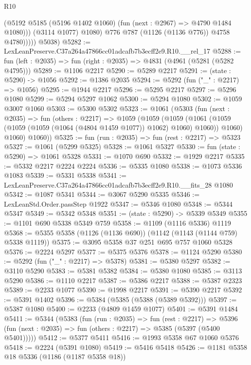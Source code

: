 \begin{lexlean}{R10}
\begin{coremodule}
                    (@5192 @5185 (@5196 @1402 @1060) (fun (next : @2967) => @4790 @1484 @1080)))
                  (@3114 @1077)
                  @1080)
                @776
                @787
                (@1126 (@1136 @776))
                @4758
                @4780)))))
      @5038)
@5282 := LexLeanPreserve.C37a264a47866cc01adcafb7b3ecff2e9.R10.__rel_17
@5288 := fun (left : @2035) => fun (right : @2035) => @4831 (@4961 (@5281 (@5282 @4795)))
@5289 := @1106 @2217
@5290 := @5289 @2217
@5291 := (state : @5290) -> @1056
@5292 := @1386 @2035
@5294 := @5292 (fun ("_" : @2217) => @1056)
@5295 := @1944 @2217
@5296 := @5295 @2217
@5297 := @5296 @1080
@5299 := @5294 @5297 @1062
@5300 := @5294 @1080
@5302 := @1059 @3007 @1060
@5303 := @5300 @5302
@5323 := @1061
    (@5303
      (fun (next : @2035) =>
      fun (others : @2217) =>
      @1059
        (@1059
          (@1059
            (@1061 (@1059 (@1059 (@1059 (@1064 (@4804 @1459 @1077)) @1062) @1060) @1060))
            @1060)
          @1060)
        @1060))
@5325 := fun (run : @2035) => fun (rest : @2217) => @5323
@5327 := @1061 (@5299 @5325)
@5328 := @1061 @5327
@5330 := fun (state : @5290) => @1061 @5328
@5331 := @1070 @690
@5332 := @1929 @2217
@5335 := @5332 @2217 @2224 @2224
@5336 := @5335 @1080
@5338 := @1073 @5336 @1083
@5339 := @5331 @5338
@5341 := LexLeanPreserve.C37a264a47866cc01adcafb7b3ecff2e9.R10.__fits_28 @1080
@5342 := @1087 @5341
@5344 := @3067 @5290 @5335
@5346 := LexLeanStd.Order.passStep @1922
@5347 := @5346 @1080
@5348 := @5344 @5347
@5349 := @5342 @5348
@5351 := (state : @5290) -> @5339 @5349
@5355 := @1101 @690 @5338 @5349 @759
@5358 := @1109 (@1116 @5336) @1119
@5368 := @5355 @5358 (@1126 (@1136 @690)) (@1142 (@1143 (@1144 @759) @5338 @1119))
@5375 := @3095 @5358 @37 @251 @695 @757 @1060 @5328
@5376 := @2224 @5297
@5377 := @5375 @5376
@5378 := @1124 @5290
@5380 := @5292 (fun ("_" : @2217) => @5378)
@5381 := @5380 @5297
@5382 := @3110 @5290
@5383 := @5381 @5382
@5384 := @5380 @1080
@5385 := @3113 @5290
@5386 := @1110 @2217
@5387 := @5386 @2217
@5388 := @5387 @2323
@5389 := @2233 @1077
@5390 := @1998 @2217
@5391 := @5390 @2217
@5392 := @5391 @1402
@5396 := @5384 (@5385 (@5388 (@5389 @5392)))
@5397 := @5387 @1080
@5400 := @2233 (@4809 @1459 @1077)
@5401 := @5391 @1484
@5411 := @5344
    (@5383
      (fun (run : @2035) =>
      fun (rest : @2217) =>
      @5396 (fun (next : @2035) => fun (others : @2217) => @5385 (@5397 (@5400 @5401)))))
@5412 := @5377 @5411
@5416 := @1993 @5358 @67 @1060 @5376
@5418 := @2224 (@5391 @1080)
@5419 := @5416 @5418
@5426 := @1181 @5358 @18 @5336 (@1186 (@1187 @5358 @18))

\end{coremodule}
\end{lexlean}
